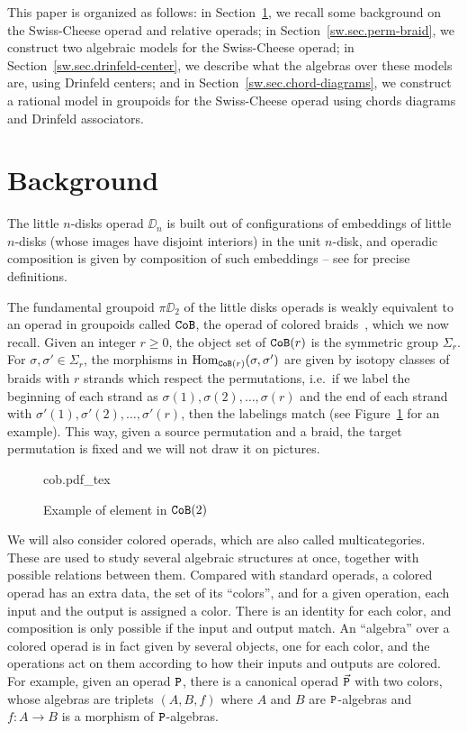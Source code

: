 This paper is organized as follows: in Section~\ref{sw.sec.background}, we recall some background on the Swiss-Cheese operad and relative operads; in Section~\ref{sw.sec.perm-braid}, we construct two algebraic models for the Swiss-Cheese operad; in Section~\ref{sw.sec.drinfeld-center}, we describe what the algebras over these models are, using Drinfeld centers; and in Section~\ref{sw.sec.chord-diagrams}, we construct a rational model in groupoids for the Swiss-Cheese operad using chords diagrams and Drinfeld associators.

\section{Background}
\label{sw.sec.background}

The little $n$-disks operad $\DD_{n}$  is built out of configurations of embeddings of little $n$-disks (whose images have disjoint interiors) in the unit $n$-disk, and operadic composition is given by composition of such embeddings -- see \cite{BoardmanVogt1973, May1972} for precise definitions.

The fundamental groupoid $\pi \DD_{2}$ of the little disks operads is weakly equivalent to an operad in groupoids called $\mathtt{CoB}$, the operad of colored braids~\cite[§I.5]{Fresse2017}, which we now recall.
Given an integer $r \geq 0$, the object set of $\mathtt{CoB}(r)$ is the symmetric group $\Sigma_{r}$.
For $\sigma, \sigma' \in \Sigma_{r}$, the morphisms in $\operatorname{Hom}_{\mathtt{CoB}(r)}(\sigma, \sigma')$ are given by isotopy classes of braids with $r$ strands which respect the permutations, i.e.\ if we label the beginning of each strand as $\sigma(1), \sigma(2), \dots, \sigma(r)$ and the end of each strand with $\sigma'(1), \sigma'(2), \dots, \sigma'(r)$, then the labelings match (see Figure~\ref{sw.fig.exa-cob} for an example).
This way, given a source permutation and a braid, the target permutation is fixed and we will not draw it on pictures.

\begin{figure}[htbp]
  \centering
  {cob.pdf_tex}
  \caption{Example of element in $\mathtt{CoB}(2)$}
  \label{sw.fig.exa-cob}
\end{figure}

We will also consider colored operads, which are also called multicategories.
These are used to study several algebraic structures at once, together with possible relations between them.
Compared with standard operads, a colored operad has an extra data, the set of its ``colors'', and for a given operation, each input and the output is assigned a color.
There is an identity for each color, and composition is only possible if the input and output match.
An ``algebra'' over a colored operad is in fact given by several objects, one for each color, and the operations act on them according to how their inputs and outputs are colored.
For example, given an operad $\mathtt{P}$, there is a canonical operad $\vec{\mathtt{P}}$ with two colors, whose algebras are triplets $(A,B,f)$ where $A$ and $B$ are $\mathtt{P}$-algebras and $f : A \to B$ is a morphism of $\mathtt{P}$-algebras.

